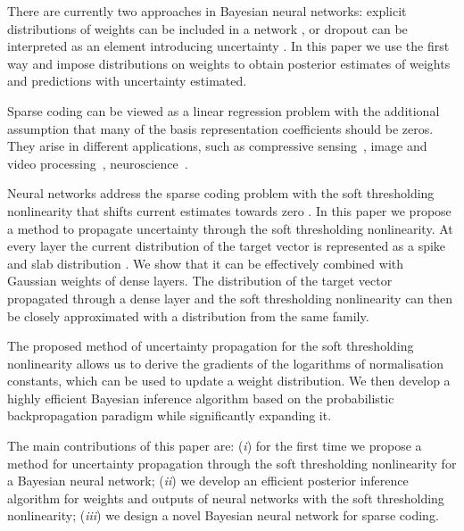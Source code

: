 \documentclass{article}
\begin{document}
There are currently two approaches in Bayesian neural networks: explicit distributions of weights can be included in a network \citep{hernandez2015probabilistic, ranganath2015deep}, or dropout can be interpreted as an element introducing uncertainty \citep{gal2016dropout}. In this paper we use the first way and impose distributions on weights to obtain posterior estimates of weights and predictions with uncertainty estimated.

Sparse coding can be viewed as a linear regression problem with the additional assumption that many of the basis representation coefficients should be zeros. They arise in different applications, such as compressive sensing~\citep{candes2008introduction}, image and video processing~\citep{mairal2014sparse}, neuroscience~\citep{baillet1997bayesian, jas2017learning}.

Neural networks address the sparse coding problem with the soft thresholding nonlinearity that shifts current estimates towards zero \citep{gregor2010learning}. In this paper we propose a method to propagate uncertainty through the soft thresholding nonlinearity. At every layer the current distribution of the target vector is represented as a spike and slab distribution \citep{mitchell1988bayesian}. We show that it can be effectively combined with Gaussian weights of dense layers. The distribution of the target vector propagated through a dense layer and the soft thresholding nonlinearity can then be closely approximated with a distribution from the same family.

The proposed method of uncertainty propagation for the soft thresholding nonlinearity allows us to derive the gradients of the logarithms of normalisation constants, which can be used to update a weight distribution. We then develop a highly efficient Bayesian inference algorithm based on the probabilistic backpropagation paradigm while significantly expanding it.

The main contributions of this paper are: (\textit{i}) for the first time we propose a method for uncertainty propagation through the soft thresholding nonlinearity for a Bayesian neural network; (\textit{ii}) we develop an efficient posterior inference algorithm for weights and outputs of neural networks with the soft thresholding nonlinearity; (\textit{iii}) we design a novel Bayesian neural network for sparse coding.

\end{document}
